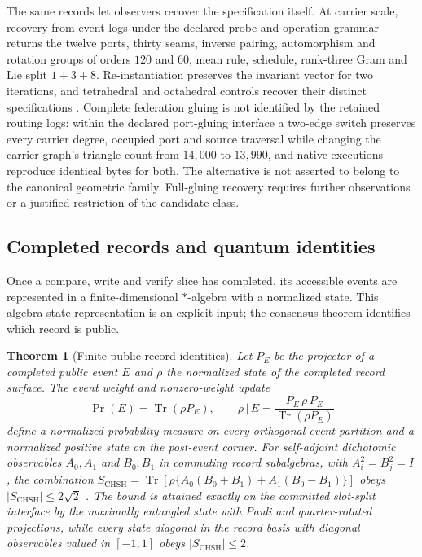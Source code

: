 \documentclass[11pt]{article}
\newtheorem{theorem}{Theorem}[section]
\theoremstyle{definition}
\theoremstyle{remark}
\begin{document}
The same records let observers recover the specification itself.
At carrier scale, recovery from event logs under the declared probe and
operation grammar returns the twelve ports, thirty seams, inverse pairing,
automorphism and rotation groups of orders $120$ and $60$, mean rule,
schedule, rank-three Gram and Lie split $1+3+8$.
Re-instantiation preserves the invariant vector for two iterations, and
tetrahedral and octahedral controls recover their distinct specifications
\cite{ophsim}. Complete federation gluing is not identified by the retained routing logs: within the declared port-gluing interface a two-edge switch preserves every carrier degree, occupied port and source traversal while changing the carrier graph's triangle count from $14{,}000$ to $13{,}990$, and native executions reproduce identical bytes for both.
The alternative is not asserted to belong to the canonical geometric family.
Full-gluing recovery requires further observations or a justified
restriction of the candidate class.

\subsection{Completed records and quantum identities}
\label{sec:quantum}

Once a compare, write and verify slice has completed, its accessible events
are represented in a finite-dimensional $*$-algebra with a normalized state.
This algebra-state representation is an explicit input; the consensus
theorem identifies which record is public.

\begin{theorem}[Finite public-record identities]
\label{thm:born}
Let $P_E$ be the projector of a completed public event $E$ and $\rho$ the
normalized state of the completed record surface. The event weight and
nonzero-weight update
\begin{equation}
\Pr(E)=\operatorname{Tr}(\rho P_E),
\qquad
\rho\,|\,E=\frac{P_E\,\rho\,P_E}{\operatorname{Tr}(\rho P_E)}
\end{equation}
define a normalized probability measure on every orthogonal event partition
and a normalized positive state on the post-event corner. For self-adjoint
dichotomic observables $A_0,A_1$ and $B_0,B_1$ in commuting record
subalgebras, with $A_i^2=B_j^2=I$, the combination
$S_{\mathrm{CHSH}}=\operatorname{Tr}[\rho\{A_0(B_0+B_1)+A_1(B_0-B_1)\}]$
obeys $|S_{\mathrm{CHSH}}|\le 2\sqrt 2$ \cite{chsh1969,tsirelson1980}. The bound is attained exactly on the
committed slot-split interface by the maximally entangled state with Pauli
and quarter-rotated projections, while every state diagonal in the record
basis with diagonal observables valued in $[-1,1]$ obeys
$|S_{\mathrm{CHSH}}|\le2$.
\end{theorem}
\end{document}
